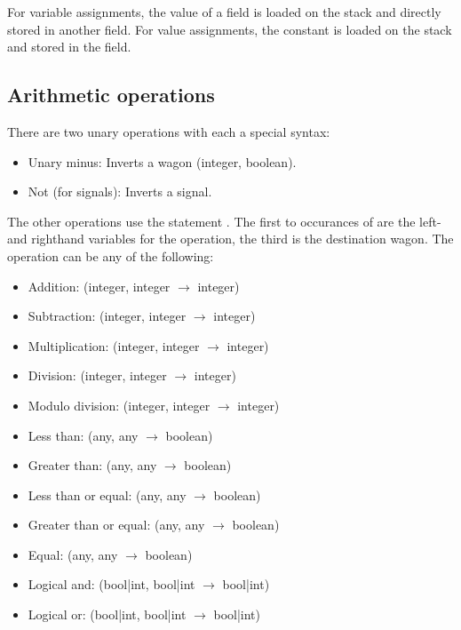 For variable assignments, the value of a field is loaded on the stack and directly stored in another field. For value assignments, the constant is loaded on the stack and stored in the field.

\subsection{Arithmetic operations}

There are two unary operations with each a special syntax:

\begin{itemize}
\item Unary minus: Inverts a wagon (integer, boolean). \\ 
\item Not (for signals): Inverts a signal. \\ 
\end{itemize}

The other operations use the statement . The first to occurances of  are the left- and righthand variables for the operation, the third  is the destination wagon. The operation  can be any of the following:

\begin{itemize}
\item Addition:  (integer, integer $\to$ integer)
\item Subtraction:  (integer, integer $\to$ integer)
\item Multiplication:  (integer, integer $\to$ integer)
\item Division:  (integer, integer $\to$ integer)
\item Modulo division:  (integer, integer $\to$ integer)
\item Less than:  (any, any $\to$ boolean)
\item Greater than:  (any, any $\to$ boolean)
\item Less than or equal:  (any, any $\to$ boolean)
\item Greater than or equal:  (any, any $\to$ boolean)
\item Equal:  (any, any $\to$ boolean)
\item Logical and:  (bool|int, bool|int $\to$ bool|int)
\item Logical or:  (bool|int, bool|int $\to$ bool|int)
\end{itemize}

